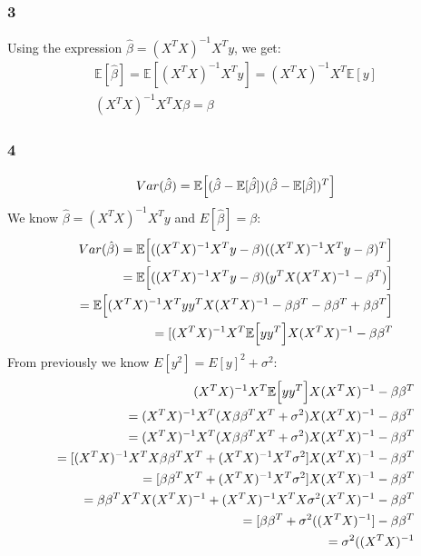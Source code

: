 \documentclass{article}
\begin{document}
\subsubsection{3}
Using the expression $\hat{\beta} = (X^TX)^{-1}X^Ty$, we get:
\begin{equation}
    \begin{split}
        \mathbb{E}[\hat{\beta}] = \mathbb{E}[(X^TX)^{-1}X^Ty] = (X^TX)^{-1}X^T\mathbb{E}[y]\\ 
        (X^TX)^{-1}X^TX\beta = \beta
    \end{split}
\end{equation}

\subsubsection{4}
\begin{equation}
    Var(\hat{\beta}) = \mathbb{E}\Bigl[(\hat{\beta} - \mathbb{E}[\hat{\beta]})(\hat{\beta} - \mathbb{E}[\hat{\beta]})^T\Bigr]
\end{equation}
We know $\hat{\beta} = (X^TX)^{-1}X^Ty$ and $E[\hat{\beta}] = \beta$:
\begin{equation}
\begin{split}
    Var(\hat{\beta}) = \mathbb{E}\Bigl[((X^TX)^{-1}X^Ty - \beta)((X^TX)^{-1}X^Ty - \beta)^T\Bigr]\\
    = \mathbb{E}\Bigl[((X^TX)^{-1}X^Ty - \beta)(y^TX(X^TX)^{-1} - \beta^T)\Bigr]\\
    = \mathbb{E}\Bigl[(X^TX)^{-1}X^Tyy^TX(X^TX)^{-1} - \beta\beta^T - \beta\beta^T + \beta\beta^T\Bigr]\\
    = [(X^TX)^{-1}X^T\mathbb{E}\Bigl[yy^T\Bigr]X(X^TX)^{-1} - \beta\beta^T\\
\end{split}
\end{equation}
From previously we know $E[y^2] = E[y]^2 + \sigma^2$:
\begin{equation}
\begin{split}
    (X^TX)^{-1}X^T\mathbb{E}\Bigl[yy^T\Bigr]X(X^TX)^{-1} - \beta\beta^T\\
    = (X^TX)^{-1}X^T(X\beta\beta^TX^T + \sigma^2)X(X^TX)^{-1} - \beta\beta^T\\
    = (X^TX)^{-1}X^T(X\beta\beta^TX^T + \sigma^2)X(X^TX)^{-1} - \beta\beta^T\\
    = [(X^TX)^{-1}X^T X\beta\beta^TX^T + (X^TX)^{-1}X^T \sigma^2]X(X^TX)^{-1} - \beta\beta^T\\
    = [\beta\beta^TX^T + (X^TX)^{-1}X^T \sigma^2]X(X^TX)^{-1} - \beta\beta^T\\
    = \beta\beta^TX^TX(X^TX)^{-1} + (X^TX)^{-1}X^TX \sigma^2(X^TX)^{-1} - \beta\beta^T\\
    = [\beta\beta^T + \sigma^2 ((X^TX)^{-1}] - \beta\beta^T\\
    = \sigma^2 ((X^TX)^{-1}\\
\end{split}
\end{equation}
\end{document}
